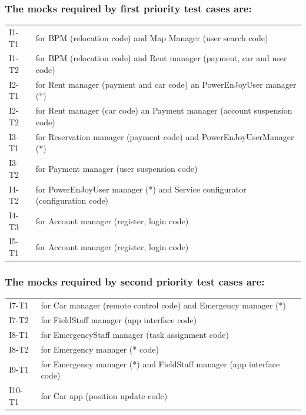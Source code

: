 \documentclass[english]{article}
\begin{document}
\subsubsection*{ The mocks required by first priority test cases are: }

\begin{table}[H]
\begin{tabular}{l | p{12cm}}

I1-T1 & for BPM (relocation code) and Map Manager (user search code)\\ 
I1-T2 & for BPM (relocation code) and Rent manager (payment, car and user code)\\
I2-T1 & for Rent manager (payment and car code) an PowerEnJoyUser manager (*) \\
I2-T2 & for Rent manager (car code) an Payment manager (account suspension code) \\
I3-T1 & for Reservation manager (payment code) and PowerEnJoyUserManager (*)\\
I3-T2 & for Payment manager (user suspension code) \\
I4-T2 & for PowerEnJoyUser manager (*) and Service configurator (configuration code) \\
I4-T3 & for Account manager (register, login code) \\
I5-T1 & for Account manager (register, login code) \\[5px]

\end{tabular}
\end{table}

\subsubsection*{ The mocks required by second priority test cases are: }

\begin{table}[H]
\begin{tabular}{l | p{12cm}}

I7-T1 & for Car manager (remote control code) and Emergency manager (*) \\

I7-T2 & for FieldStaff manager (app interface code)  \\

I8-T1 & for  EmergencyStaff manager (task assignment code) \\

I8-T2 & for Emergency manager (* code)  \\

I9-T1 & for Emergency manager (*) and FieldStaff manager (app interface code) \\

I10-T1 & for Car app (position update code)  \\[5px]

\end{tabular}
\end{table}
\end{document}
